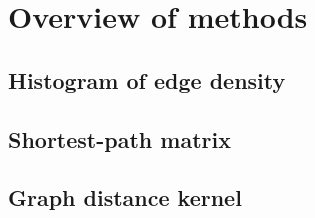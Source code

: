 \section{Overview of methods}
\label{sec:gc:methods}

\subsection{Histogram of edge density}

\subsection{Shortest-path matrix}

\subsection{Graph distance kernel}